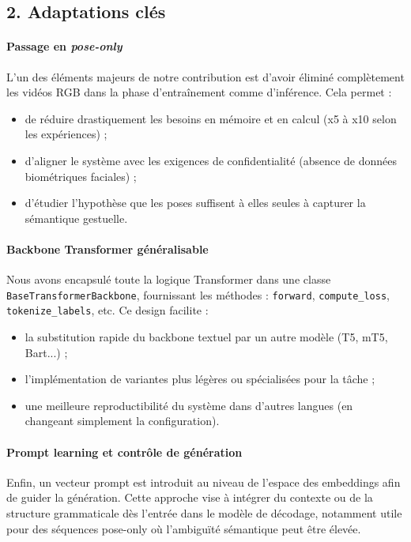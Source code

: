 \subsection*{2. Adaptations clés}

\paragraph{Passage en \textit{pose-only}}

L’un des éléments majeurs de notre contribution est d’avoir éliminé complètement les vidéos RGB dans la phase d’entraînement comme d’inférence. Cela permet :
\begin{itemize}
    \item de réduire drastiquement les besoins en mémoire et en calcul (x5 à x10 selon les expériences) ;
    \item d’aligner le système avec les exigences de confidentialité (absence de données biométriques faciales) ;
    \item d’étudier l’hypothèse que les poses suffisent à elles seules à capturer la sémantique gestuelle.
\end{itemize}

\paragraph{Backbone Transformer généralisable}

Nous avons encapsulé toute la logique Transformer dans une classe \texttt{BaseTransformerBackbone}, fournissant les méthodes :
\texttt{forward}, \texttt{compute\_loss}, \texttt{tokenize\_labels}, etc. Ce design facilite :
\begin{itemize}
    \item la substitution rapide du backbone textuel par un autre modèle (T5, mT5, Bart...) ;
    \item l’implémentation de variantes plus légères ou spécialisées pour la tâche ;
    \item une meilleure reproductibilité du système dans d’autres langues (en changeant simplement la configuration).
\end{itemize}

\paragraph{Prompt learning et contrôle de génération}

Enfin, un vecteur prompt est introduit au niveau de l’espace des embeddings afin de guider la génération. Cette approche vise à intégrer du contexte ou de la structure grammaticale dès l’entrée dans le modèle de décodage, notamment utile pour des séquences pose-only où l’ambiguïté sémantique peut être élevée.

